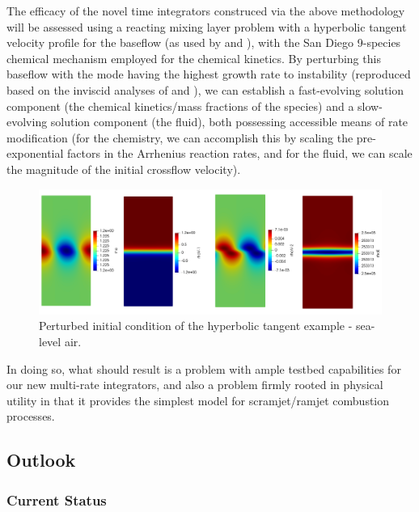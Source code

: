 The efficacy of the novel time integrators construced via the above methodology will
be assessed using a reacting mixing layer problem with a hyperbolic tangent velocity profile
for the baseflow (as used by \cite{michalke1964inviscid} and \cite{blumen1970shear}), with
the San Diego 9-species chemical mechanism \cite{sandiego} employed for the chemical kinetics. By perturbing
this baseflow with the mode having the highest growth rate to instability (reproduced based
on the inviscid analyses of \cite{michalke1964inviscid} and \cite{blumen1970shear}), we can
establish a fast-evolving solution component (the chemical kinetics/mass fractions of the
species) and a slow-evolving solution component (the fluid), both possessing accessible
means of rate modification (for the chemistry, we can accomplish this by scaling the
pre-exponential factors in the Arrhenius reaction rates, and for the fluid, we can scale
the magnitude of the initial crossflow velocity).
\begin{figure}
\centering
\includegraphics[width=0.8\linewidth,trim=4 4 4 4,clip]{figures/hyperbolic_tangent_air.png}
\caption{Perturbed initial condition of the hyperbolic tangent example - sea-level air.}
\label{fig:hyperbolic_cold_rhov2}
\end{figure}
In doing so, what should result is a problem with ample testbed capabilities for our
new multi-rate integrators, and also a problem firmly rooted in physical utility in that
it provides the simplest model for scramjet/ramjet combustion processes.

\subsection{Outlook}

\subsubsection{Current Status}

